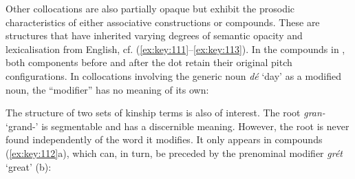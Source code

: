 
Other collocations are also partially opaque but exhibit the prosodic characteristics of either associative constructions or compounds. These are  structures that have inherited varying degrees of semantic opacity and lexicalisation from English, cf. (\ref{ex:key:111}–\ref{ex:key:113}). In the compounds in , both components before and after the dot retain their original pitch configurations. In collocations involving the generic noun \textit{dé} ‘day’ as a modified noun, the “modifier” has no meaning of its own:

The structure of two sets of kinship terms is also of interest. The root \textit{gran-} ‘grand-’ is segmentable and has a discernible meaning. However, the root is never found independently of the word it modifies. It only appears in compounds (\ref{ex:key:112}a), which can, in turn, be preceded by the prenominal modifier \textit{grét} ‘great’ (b):


